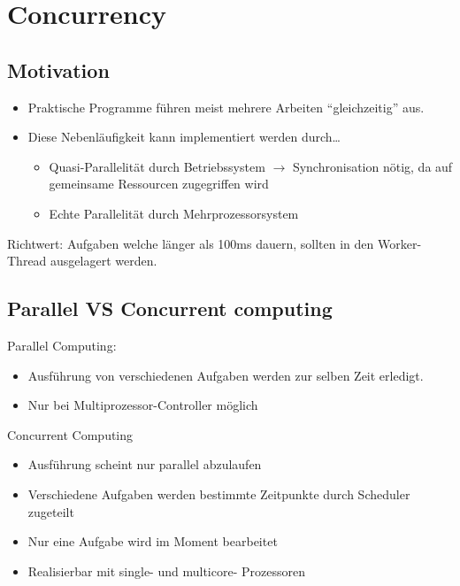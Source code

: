 \section{Concurrency}

\subsection{Motivation}
\begin{itemize}
  \item Praktische Programme führen meist mehrere Arbeiten "`gleichzeitig"' aus. 
  \item Diese Nebenläufigkeit kann implementiert werden durch\ldots
  \begin{itemize}
    \item Quasi-Parallelität durch Betriebssystem $\rightarrow$ Synchronisation
    nötig, da auf gemeinsame Ressourcen zugegriffen wird
    \item Echte Parallelität durch Mehrprozessorsystem
  \end{itemize}
\end{itemize}
Richtwert: Aufgaben welche länger als 100ms dauern, sollten in den Worker-Thread ausgelagert werden.

\subsection{Parallel VS Concurrent computing}
\begin{multicols}{2}
  Parallel Computing:
  \begin{itemize}
    \item Ausf\"uhrung von verschiedenen Aufgaben werden zur selben Zeit erledigt.
    \item Nur bei Multiprozessor-Controller m\"oglich
  \end{itemize}
\vfill\null
\columnbreak
  Concurrent Computing
  \begin{itemize}
    \item Ausf\"uhrung scheint nur parallel abzulaufen
    \item Verschiedene Aufgaben werden bestimmte Zeitpunkte durch Scheduler zugeteilt
    \item Nur eine Aufgabe wird im Moment bearbeitet
    \item Realisierbar mit single- und multicore- Prozessoren
  \end{itemize}
\end{multicols}

